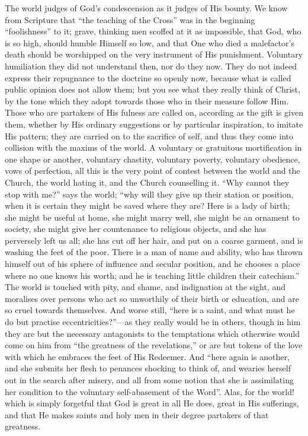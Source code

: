The world judges of God's condescension as it judges of His bounty.
We know from Scripture that ``the teaching of the Cross'' was
in the beginning ``foolishness'' to it; grave, thinking men scoffed
at it as impossible, that God, who is so high, should humble Himself
so low, and that One who died a malefactor's death should be
worshipped on the very instrument of His punishment. Voluntary
humiliation they did not understand then, nor do they now. They do not
indeed express their repugnance to the doctrine so openly now, because
what is called public opinion does not allow them; but you see what
they really think of Christ, by the tone which they adopt towards
those who in their measure follow Him. Those who are partakers of His
fulness are called on, according as the gift is given them, whether by
His ordinary suggestions or by particular inspiration, to imitate His
pattern; they are carried on to the sacrifice of self, and thus they
come into collision with the maxims of the world. A voluntary or
gratuitous mortification in one shape or another, voluntary chastity,
voluntary poverty, voluntary obedience, vows of perfection, all this
is the very point of contest between the world and the Church, the
world hating it, and the Church counselling it. ``Why cannot they
stop with me?'' says the world; ``why will they give up their
station or position, when it is certain they might be saved where they
are? Here is a lady of birth; she might be useful at home, she might
marry well, she might be an ornament to society, she might give her
countenance to religious objects, and she has perversely left us all;
she has cut off her hair, and put on a coarse garment, and is washing
the feet of the poor. There is a man of name and ability, who has
thrown himself out of his sphere of influence and secular position,
and he chooses a place where no one knows his worth; and he is
teaching little children their catechism.'' The world is touched
with pity, and shame, and indignation at the sight, and moralises over
persons who act so unworthily of their birth or education, and are so
cruel towards themselves. And worse still, ``here is a saint, and
what must he do but practise eccentricities?''—as they really
would be in others, though in him they are but the necessary
antagonists to the temptations which otherwise would come on him from
``the greatness of the revelations,'' or are but tokens of the
love with which he embraces the feet of His Redeemer. And ``here
again is another, and she submits her flesh to penances shocking to
think of, and wearies herself out in the search after misery, and all
from some notion that she is assimilating her condition to the
voluntary self-abasement of the Word''. Alas, for the world! which
is simply forgetful that God is great in all He does, great in His
sufferings, and that He makes saints and holy men in their degree
partakers of that greatness.

